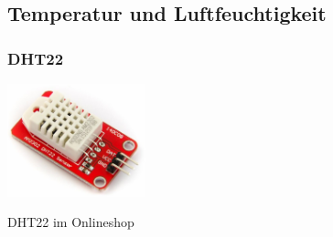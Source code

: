 \documentclass[
  12pt, %
  a4paper, %
  twoside, %
  openany, %
  numbers=noenddot, %
  BCOR=5mm, %
  parskip=half*, %
  thesis, %
]{bfhbook}
\newcommand{\compImgSize}{4cm}
\begin{document}
 \subsection{Temperatur und Luftfeuchtigkeit}
 \subsubsection{DHT22}\label{DHT22}
\begin{flushleft}
	\begin{minipage}[t]{0.5\linewidth}
		\centering
    		\includegraphics[width=\compImgSize, left]{Bilder/DHT22.jpg}
	\end{minipage}%
	\begin{minipage}[t]{0.5\linewidth}
	DHT22 im Onlineshop \footnotemark
	\end{minipage}
\end{flushleft}
\end{document}
